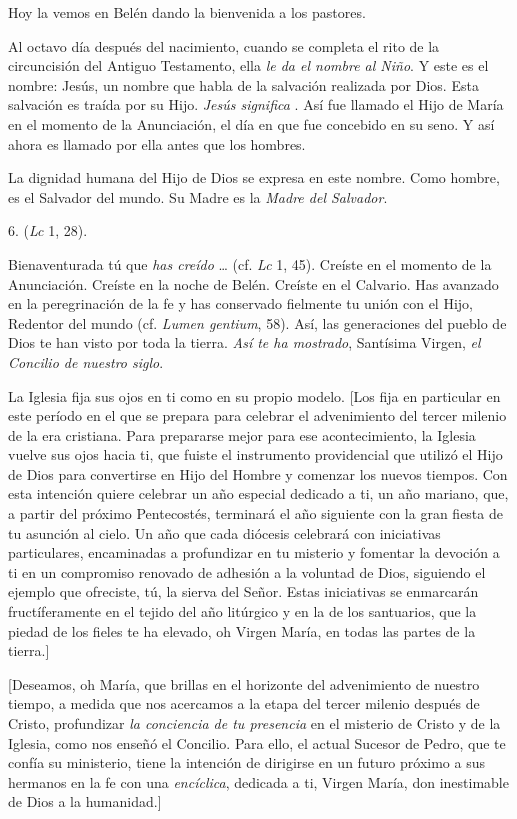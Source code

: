 \begin{body}
	Hoy la vemos en Belén dando la bienvenida a los pastores.
	
	Al octavo día después del nacimiento, cuando se completa el rito de la circuncisión del Antiguo Testamento, ella \emph{le da el nombre al 	Niño}. Y este es el nombre: Jesús, un nombre que habla de la salvación realizada por Dios. Esta salvación es traída por su Hijo. \emph{Jesús 	significa }. Así fue llamado el Hijo de María en el momento de la Anunciación, el día en que fue concebido en su seno. Y así ahora es llamado por ella antes que los hombres.
	
	La dignidad humana del Hijo de Dios se expresa en este nombre. Como hombre, es el Salvador del mundo. Su Madre es la \emph{Madre del 	Salvador}.
	
	6.  (\emph{Lc} 1, 28).
	
	Bienaventurada tú que \emph{has creído} \ldots{} (cf. \emph{Lc} 1, 45). Creíste en el momento de la Anunciación. Creíste en la noche de Belén. Creíste en el Calvario. Has avanzado en la peregrinación de la fe y has conservado fielmente tu unión con el Hijo, Redentor del mundo (cf. \emph{Lumen gentium}, 58). Así, las generaciones del pueblo de Dios te han visto por toda la tierra. \emph{Así te ha mostrado}, Santísima Virgen, \emph{el Concilio de nuestro siglo}.
	
	La Iglesia fija sus ojos en ti como en su propio modelo. {[}Los fija en particular en este período en el que se prepara para celebrar el advenimiento del tercer milenio de la era cristiana. Para prepararse mejor para ese acontecimiento, la Iglesia vuelve sus ojos hacia ti, que fuiste el instrumento providencial que utilizó el Hijo de Dios para convertirse en Hijo del Hombre y comenzar los nuevos tiempos. Con esta intención quiere celebrar un año especial dedicado a ti, un año mariano, que, a partir del próximo Pentecostés, terminará el año siguiente con la gran fiesta de tu asunción al cielo. Un año que cada diócesis celebrará con iniciativas particulares, encaminadas a profundizar en tu misterio y fomentar la devoción a ti en un compromiso renovado de adhesión a la voluntad de Dios, siguiendo el ejemplo que ofreciste, tú, la sierva del Señor. Estas iniciativas se enmarcarán fructíferamente en el tejido del año litúrgico y en la  de los santuarios, que la piedad de los fieles te ha elevado, oh Virgen María, en todas las partes de la tierra.{]}
	
	{[}Deseamos, oh María, que brillas en el horizonte del advenimiento de nuestro tiempo, a medida que nos acercamos a la etapa del tercer milenio después de Cristo, profundizar \emph{la conciencia de tu presencia} en el misterio de Cristo y de la Iglesia, como nos enseñó el Concilio. Para ello, el actual Sucesor de Pedro, que te confía su ministerio, tiene la intención de dirigirse en un futuro próximo a sus hermanos en la fe con una \emph{encíclica}, dedicada a ti, Virgen María, don inestimable de Dios a la humanidad.{]}
	

\end{body}
